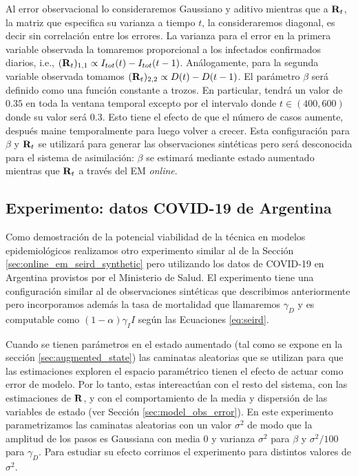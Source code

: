 Al error observacional lo consideraremos Gaussiano y aditivo mientras que a $\mathbf{R}_t$, la matriz que especifica su varianza a tiempo $t$, la consideraremos diagonal, es decir sin correlación entre los errores. La varianza para el error en la primera variable observada la tomaremos proporcional a los infectados confirmados diarios,  i.e., $(\mathbf{R}_t)_{1,1} \propto I_{tot}(t) - I_{tot}(t-1)$. Análogamente, para la segunda variable observada tomamos $(\mathbf{R}_t)_{2,2} \propto D(t) - D(t-1)$. El parámetro $\beta$ será definido como una función constante a trozos. En particular, tendrá un valor de $0.35$ en toda la ventana temporal excepto por el intervalo donde $t \in (400, 600)$ donde su valor será $0.3$. Esto tiene el efecto de que el número de casos aumente, después maine temporalmente para luego volver a crecer. Esta configuración para $\beta$ y $\mathbf{R}_t$ se utilizará para generar las observaciones sintéticas pero será desconocida para el sistema de asimilación: $\beta$ se estimará mediante estado aumentado mientras que $\mathbf{R}_t$ a través del EM \textit{online}.

\subsection{Experimento: datos COVID-19 de Argentina}
Como demostración de la potencial viabilidad de la técnica en modelos epidemiológicos realizamos otro experimento similar al de la Sección \ref{sec:online_em_seird_synthetic} pero utilizando los datos de COVID-19 en Argentina provistos por el Ministerio de Salud. El experimento tiene una configuración similar al de observaciones sintéticas que describimos anteriormente pero incorporamos además la tasa de mortalidad que llamaremos $\gamma_D$ y es computable como $(1-\alpha) \gamma_I I$ según las Ecuaciones \ref{eq:seird}.

Cuando se tienen parámetros en el estado aumentado (tal como se expone en la sección \ref{sec:augmented_state}) las caminatas aleatorias que se utilizan para que las estimaciones exploren el espacio paramétrico tienen el efecto de actuar como error de modelo. Por lo tanto, estas intereactúan con el resto del sistema, con las estimaciones de $\mathbf{R}$, y con el comportamiento de la media y dispersión de las variables de estado (ver Sección \ref{sec:model_obs_error}). En este experimento parametrizamos las caminatas aleatorias con un valor $\sigma^2$ de modo que la amplitud de los pasos es Gaussiana con media 0 y varianza $\sigma^2$ para $\beta$ y $\sigma^2/100$ para $\gamma_D$. Para estudiar su efecto corrimos el experimento para distintos valores de $\sigma^2$. 

